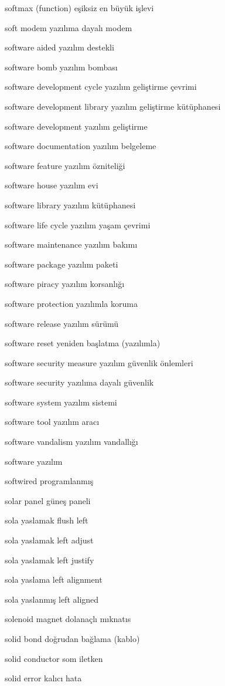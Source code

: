 \documentclass[12pt,fleqn]{article}\usepackage{../../common}
\begin{document}
softmax (function) eşiksiz en büyük işlevi

soft modem yazılıma dayalı modem

software aided yazılım destekli

software bomb yazılım bombası

software development cycle yazılım geliştirme çevrimi

software development library yazılım geliştirme kütüphanesi

software development yazılım geliştirme

software documentation yazılım belgeleme

software feature yazılım özniteliği

software house yazılım evi

software library yazılım kütüphanesi

software life cycle yazılım yaşam çevrimi

software maintenance yazılım bakımı

software package yazılım paketi

software piracy yazılım korsanlığı

software protection yazılımla koruma

software release yazılım sürümü

software reset yeniden başlatma (yazılımla)

software security measure yazılım güvenlik önlemleri

software security yazılıma dayalı güvenlik

software system yazılım sistemi

software tool yazılım aracı

software vandalism yazılım vandallığı

software yazılım

softwired programlanmış

solar panel güneş paneli

sola yaslamak flush left

sola yaslamak left adjust

sola yaslamak left justify

sola yaslama left alignment

sola yaslanmış left aligned

solenoid magnet dolanaçlı mıknatıs

solid bond doğrudan bağlama (kablo)

solid conductor som iletken

solid error kalıcı hata
\end{document}
